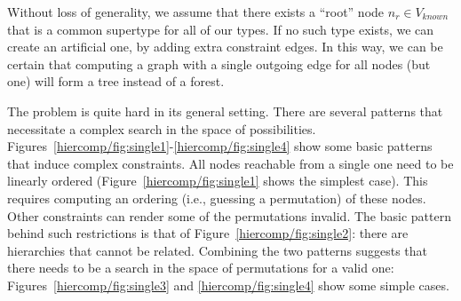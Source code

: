 Without loss of generality, we assume that there exists a ``root''
node $n_r \in V_{known}$ that is a common supertype for all of our
types. If no such type exists, we can create an artificial one, by
adding extra constraint edges. In this way, we can be certain that
computing a graph with a single outgoing edge for all nodes (but one)
will form a tree instead of a forest.




The problem is quite hard in its general setting. There are several
patterns that necessitate a complex search in the space of
possibilities. Figures~\ref{hiercomp/fig:single1}-\ref{hiercomp/fig:single4} show some
basic patterns that induce complex constraints. All nodes reachable
from a single one need to be linearly ordered
(Figure~\ref{hiercomp/fig:single1} shows the simplest case). This requires
computing an ordering (i.e., guessing a permutation) of these
nodes. Other constraints can render some of the permutations
invalid. The basic pattern behind such restrictions is that of
Figure~\ref{hiercomp/fig:single2}: there are hierarchies that cannot be
related. Combining the two patterns suggests that there needs to be a
search in the space of permutations for a valid one:
Figures~\ref{hiercomp/fig:single3} and \ref{hiercomp/fig:single4} show some simple
cases.


